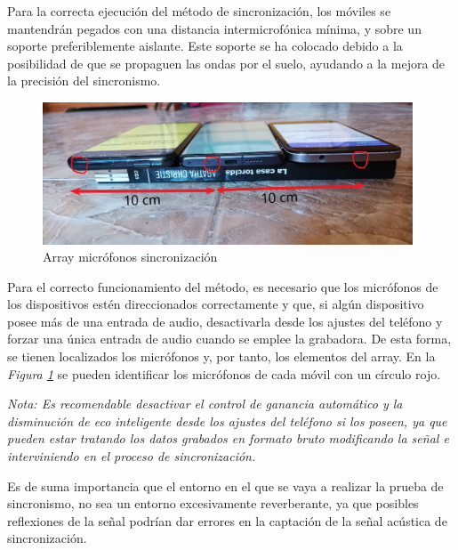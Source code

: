 \documentclass[a4paper,11pt]{book}
\begin{document}
Para la correcta ejecución del método de sincronización, los móviles se mantendrán pegados con una distancia intermicrofónica mínima, y sobre un soporte preferiblemente aislante. Este soporte se ha colocado debido a la posibilidad de que se propaguen las ondas por el suelo, ayudando a la mejora de la precisión del sincronismo.

\begin{figure}[hbtp]
\centering
\includegraphics[width = 11cm]{FIGURAS/sincro_montaje.jpg}
\caption{Array micrófonos sincronización}
\label{montaje_sincro}
\end{figure}

Para el correcto funcionamiento del método, es necesario que los micrófonos de los dispositivos estén direccionados correctamente y que, si algún dispositivo posee más de una entrada de audio, desactivarla desde los ajustes del teléfono y forzar una única entrada de audio cuando se emplee la grabadora. De esta forma, se tienen localizados los micrófonos y, por tanto, los elementos del array. En la \textit{Figura \ref{montaje_sincro}} se pueden identificar los micrófonos de cada móvil con un círculo rojo.

\textit{Nota: Es recomendable desactivar el control de ganancia automático y la disminución de eco inteligente desde los ajustes del teléfono si los poseen, ya que pueden estar tratando los datos grabados en formato bruto modificando la señal e interviniendo en el proceso de sincronización.}

Es de suma importancia que el entorno en el que se vaya a realizar la prueba de sincronismo, no sea un entorno excesivamente reverberante, ya que posibles reflexiones de la señal podrían dar errores en la captación de la señal acústica de sincronización.
\end{document}

